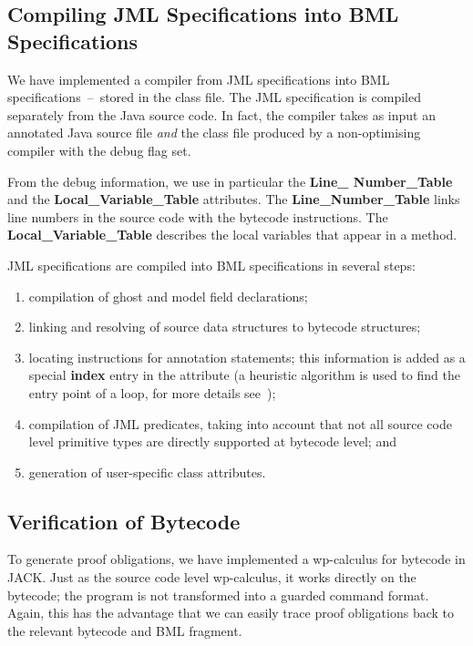 \subsection{Compiling JML Specifications into BML Specifications}

We have implemented a compiler from JML specifications into BML
specifications~--~stored in the class file. The JML specification is
compiled separately from the Java source code. In fact, the compiler
takes as input an annotated Java source file
\emph{and} the class file produced by a non-optimising compiler
with the debug flag set. 

From the debug information, we use in particular the
\textbf{Line\_ Number\_Table} and the \textbf{Local\_Variable\_Table}
attributes. The \textbf{Line\_Number\_Table} links line numbers in the
source code with the bytecode instructions.  The
\textbf{Local\_Variable\_Table} describes the local variables that
appear in a method.  

JML specifications are compiled into BML specifications in several
steps:

\begin{enumerate}

\item compilation of ghost and model field declarations;


\item linking and resolving of source data structures to bytecode structures;

\item locating instructions for annotation statements; this
information is added as a special \textbf{index} entry in the
attribute (a heuristic algorithm is used to find the entry point of a
loop, for more details see~\cite{Pavlova:phd});

 
\item compilation of JML predicates, taking into account that not all
source code level primitive types are directly supported at bytecode
level; and

\item generation of user-specific class attributes.
    
\end{enumerate}


\subsection{Verification of Bytecode}
To generate proof obligations, we have implemented a wp-calculus for
bytecode in JACK. Just as the source code level wp-calculus, it
works directly on the bytecode; the program is not transformed into a
guarded command format. Again, this has the
advantage that we can easily trace proof obligations back to the
relevant bytecode and BML fragment.

